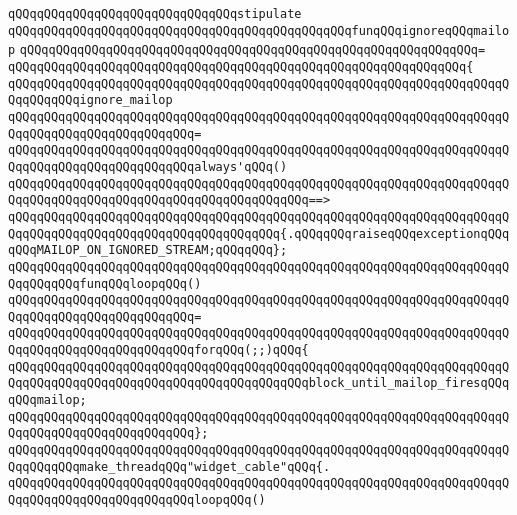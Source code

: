 \verb|qQQqqQQqqQQqqQQqqQQqqQQqqQQqqQQqstipulate|\newline
\newline
\verb|qQQqqQQqqQQqqQQqqQQqqQQqqQQqqQQqqQQqqQQqqQQqqQQqfunqQQqignoreqQQqmailop|\newline
\verb|qQQqqQQqqQQqqQQqqQQqqQQqqQQqqQQqqQQqqQQqqQQqqQQqqQQqqQQqqQQqqQQq=|\newline
\verb|qQQqqQQqqQQqqQQqqQQqqQQqqQQqqQQqqQQqqQQqqQQqqQQqqQQqqQQqqQQqqQQq{|\newline
\verb|qQQqqQQqqQQqqQQqqQQqqQQqqQQqqQQqqQQqqQQqqQQqqQQqqQQqqQQqqQQqqQQqqQQqqQQqqQQqqQQqignore_mailop|\newline
\verb|qQQqqQQqqQQqqQQqqQQqqQQqqQQqqQQqqQQqqQQqqQQqqQQqqQQqqQQqqQQqqQQqqQQqqQQqqQQqqQQqqQQqqQQqqQQqqQQq=|\newline
\verb|qQQqqQQqqQQqqQQqqQQqqQQqqQQqqQQqqQQqqQQqqQQqqQQqqQQqqQQqqQQqqQQqqQQqqQQqqQQqqQQqqQQqqQQqqQQqqQQqalways'qQQq()|\newline
\verb|qQQqqQQqqQQqqQQqqQQqqQQqqQQqqQQqqQQqqQQqqQQqqQQqqQQqqQQqqQQqqQQqqQQqqQQqqQQqqQQqqQQqqQQqqQQqqQQqqQQqqQQqqQQqqQQq==>|\newline
\verb|qQQqqQQqqQQqqQQqqQQqqQQqqQQqqQQqqQQqqQQqqQQqqQQqqQQqqQQqqQQqqQQqqQQqqQQqqQQqqQQqqQQqqQQqqQQqqQQqqQQqqQQqqQQq{.qQQqqQQqraiseqQQqexceptionqQQqqQQqMAILOP_ON_IGNORED_STREAM;qQQqqQQq};|\newline
\newline
\verb|qQQqqQQqqQQqqQQqqQQqqQQqqQQqqQQqqQQqqQQqqQQqqQQqqQQqqQQqqQQqqQQqqQQqqQQqqQQqqQQqfunqQQqloopqQQq()|\newline
\verb|qQQqqQQqqQQqqQQqqQQqqQQqqQQqqQQqqQQqqQQqqQQqqQQqqQQqqQQqqQQqqQQqqQQqqQQqqQQqqQQqqQQqqQQqqQQqqQQq=|\newline
\verb|qQQqqQQqqQQqqQQqqQQqqQQqqQQqqQQqqQQqqQQqqQQqqQQqqQQqqQQqqQQqqQQqqQQqqQQqqQQqqQQqqQQqqQQqqQQqqQQqforqQQq(;;)qQQq{|\newline
\verb|qQQqqQQqqQQqqQQqqQQqqQQqqQQqqQQqqQQqqQQqqQQqqQQqqQQqqQQqqQQqqQQqqQQqqQQqqQQqqQQqqQQqqQQqqQQqqQQqqQQqqQQqqQQqqQQqblock_until_mailop_firesqQQqqQQqmailop;|\newline
\verb|qQQqqQQqqQQqqQQqqQQqqQQqqQQqqQQqqQQqqQQqqQQqqQQqqQQqqQQqqQQqqQQqqQQqqQQqqQQqqQQqqQQqqQQqqQQqqQQq};|\newline
\newline
\verb|qQQqqQQqqQQqqQQqqQQqqQQqqQQqqQQqqQQqqQQqqQQqqQQqqQQqqQQqqQQqqQQqqQQqqQQqqQQqqQQqmake_threadqQQq"widget_cable"qQQq{.|\newline
\newline
\verb|qQQqqQQqqQQqqQQqqQQqqQQqqQQqqQQqqQQqqQQqqQQqqQQqqQQqqQQqqQQqqQQqqQQqqQQqqQQqqQQqqQQqqQQqqQQqqQQqloopqQQq()|\newline
